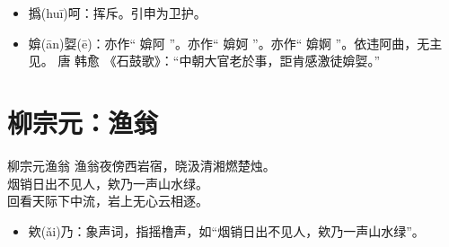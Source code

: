 \documentclass[12pt,oneside,a5paper]{book}
\begin{document}
\begin{itemize}
\item 撝(huī)呵：挥斥。引申为卫护。
\item 媕(ān)娿(ē)：亦作“ 媕阿 ”。亦作“ 媕妸 ”。亦作“ 媕婀 ”。依违阿曲，无主见。 唐 韩愈 《石鼓歌》：“中朝大官老於事，詎肯感激徒媕娿。”
\end{itemize}


\chapter{柳宗元：渔翁}
\begin{poemzh}{柳宗元}{渔翁}
渔翁夜傍西岩宿，晓汲清湘燃楚烛。\\
烟销日出不见人，欸乃一声山水绿。\\
回看天际下中流，岩上无心云相逐。\\ 
\end{poemzh}

\begin{itemize}
\item 欸(ǎi)乃：象声词，指摇橹声，如“烟销日出不见人，欸乃一声山水绿”。
\end{itemize}
\end{document}
